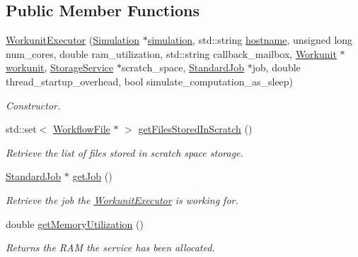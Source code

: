 \subsection*{Public Member Functions}
\begin{DoxyCompactItemize}
\item 
\hyperlink{classwrench_1_1_workunit_executor_ac89772afa4d480de6b7033a2d435e160}{Workunit\+Executor} (\hyperlink{classwrench_1_1_simulation}{Simulation} $\ast$\hyperlink{classwrench_1_1_s4_u___daemon_a305beca7ad2fb650ad1492b7c95e93c4}{simulation}, std\+::string \hyperlink{classwrench_1_1_s4_u___daemon_a52bc0b9a6cd248310749dac086819f00}{hostname}, unsigned long num\+\_\+cores, double ram\+\_\+utilization, std\+::string callback\+\_\+mailbox, \hyperlink{classwrench_1_1_workunit}{Workunit} $\ast$\hyperlink{classwrench_1_1_workunit_executor_aeadc474fc7ec48fbb1f25d96389217e3}{workunit}, \hyperlink{classwrench_1_1_storage_service}{Storage\+Service} $\ast$scratch\+\_\+space, \hyperlink{classwrench_1_1_standard_job}{Standard\+Job} $\ast$job, double thread\+\_\+startup\+\_\+overhead, bool simulate\+\_\+computation\+\_\+as\+\_\+sleep)
\begin{DoxyCompactList}\small\item\em Constructor. \end{DoxyCompactList}\item 
std\+::set$<$ \hyperlink{classwrench_1_1_workflow_file}{Workflow\+File} $\ast$ $>$ \hyperlink{classwrench_1_1_workunit_executor_aa78ea4fb4b87bb2f8d1c874ce2866b4f}{get\+Files\+Stored\+In\+Scratch} ()
\begin{DoxyCompactList}\small\item\em Retrieve the list of files stored in scratch space storage. \end{DoxyCompactList}\item 
\hyperlink{classwrench_1_1_standard_job}{Standard\+Job} $\ast$ \hyperlink{classwrench_1_1_workunit_executor_a20e9b881062a18d8316695d8d7ce02b5}{get\+Job} ()
\begin{DoxyCompactList}\small\item\em Retrieve the job the \hyperlink{classwrench_1_1_workunit_executor}{Workunit\+Executor} is working for. \end{DoxyCompactList}\item 
double \hyperlink{classwrench_1_1_workunit_executor_a5992f298e0eb07604af3061d7d6b2fd9}{get\+Memory\+Utilization} ()
\begin{DoxyCompactList}\small\item\em Returns the R\+AM the service has been allocated. \end{DoxyCompactList}\item 

\end{DoxyCompactItemize}
